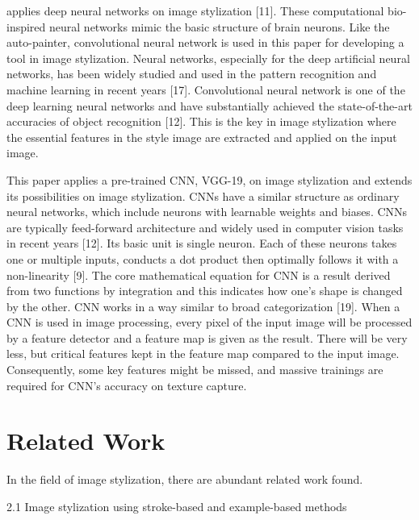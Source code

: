 \documentclass[runningheads]{llncs}
\begin{document}
applies deep neural networks on image stylization [11]. These computational 
bio-inspired neural networks mimic the basic structure of brain neurons. 
Like the auto-painter, convolutional neural network is used in this paper 
for developing a tool in image stylization. Neural networks, especially for 
the deep artificial neural networks, has been widely studied and used in the 
pattern recognition and machine learning in recent years [17]. Convolutional 
neural network is one of the deep learning neural networks and have 
substantially achieved the state-of-the-art accuracies of object recognition 
[12]. This is the key in image stylization where the essential features in the 
style image are extracted and applied on the input image. 

This paper applies a pre-trained CNN, VGG-19, on image stylization and 
extends its possibilities on image stylization. CNNs have a similar structure 
as ordinary neural networks, which include neurons with learnable weights and 
biases. CNNs are typically feed-forward architecture and widely used in computer
vision tasks in recent years [12]. Its basic unit is single neuron. Each of 
these neurons takes one or multiple inputs, conducts a dot product then 
optimally follows it with a non-linearity [9]. The core mathematical equation 
for CNN is a result derived from two functions by integration and this indicates 
how one’s shape is changed by the other. CNN works in a way similar to broad 
categorization [19]. When a CNN is used in image processing, every pixel of the 
input image will be processed by a feature detector and a feature map is given 
as the result. There will be very less, but critical features kept in the 
feature map compared to the input image. Consequently, some key features might 
be missed, and massive trainings are required for CNN’s accuracy on texture 
capture. 

\section{Related Work}

In the field of image stylization, there are abundant related work found. 

2.1 Image stylization using stroke-based and example-based methods 
\end{document}
